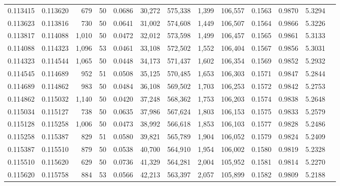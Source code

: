 \begin{tabular}{rrrrrrrrrrrrr}
0.113415 & 0.113620 &   679 &  50 &                                     0.0686 &  30,272 & 575,338 &   1,399 & 106,557 & 0.1563 & 0.9870 & 5.3294 \\
0.113623 & 0.113816 &   730 &  50 &                                     0.0641 &  31,002 & 574,608 &   1,449 & 106,507 & 0.1564 & 0.9866 & 5.3226 \\
0.113817 & 0.114088 & 1,010 &  50 &                                     0.0472 &  32,012 & 573,598 &   1,499 & 106,457 & 0.1565 & 0.9861 & 5.3133 \\
0.114088 & 0.114323 & 1,096 &  53 &                                     0.0461 &  33,108 & 572,502 &   1,552 & 106,404 & 0.1567 & 0.9856 & 5.3031 \\
0.114323 & 0.114544 & 1,065 &  50 &                                     0.0448 &  34,173 & 571,437 &   1,602 & 106,354 & 0.1569 & 0.9852 & 5.2932 \\
0.114545 & 0.114689 &   952 &  51 &                                     0.0508 &  35,125 & 570,485 &   1,653 & 106,303 & 0.1571 & 0.9847 & 5.2844 \\
0.114689 & 0.114862 &   983 &  50 &                                     0.0484 &  36,108 & 569,502 &   1,703 & 106,253 & 0.1572 & 0.9842 & 5.2753 \\
0.114862 & 0.115032 & 1,140 &  50 &                                     0.0420 &  37,248 & 568,362 &   1,753 & 106,203 & 0.1574 & 0.9838 & 5.2648 \\
0.115034 & 0.115127 &   738 &  50 &                                     0.0635 &  37,986 & 567,624 &   1,803 & 106,153 & 0.1575 & 0.9833 & 5.2579 \\
0.115128 & 0.115258 & 1,006 &  50 &                                     0.0473 &  38,992 & 566,618 &   1,853 & 106,103 & 0.1577 & 0.9828 & 5.2486 \\
0.115258 & 0.115387 &   829 &  51 &                                     0.0580 &  39,821 & 565,789 &   1,904 & 106,052 & 0.1579 & 0.9824 & 5.2409 \\
0.115387 & 0.115510 &   879 &  50 &                                     0.0538 &  40,700 & 564,910 &   1,954 & 106,002 & 0.1580 & 0.9819 & 5.2328 \\
0.115510 & 0.115620 &   629 &  50 &                                     0.0736 &  41,329 & 564,281 &   2,004 & 105,952 & 0.1581 & 0.9814 & 5.2270 \\
0.115620 & 0.115758 &   884 &  53 &                                     0.0566 &  42,213 & 563,397 &   2,057 & 105,899 & 0.1582 & 0.9809 & 5.2188 \\

\end{tabular}
